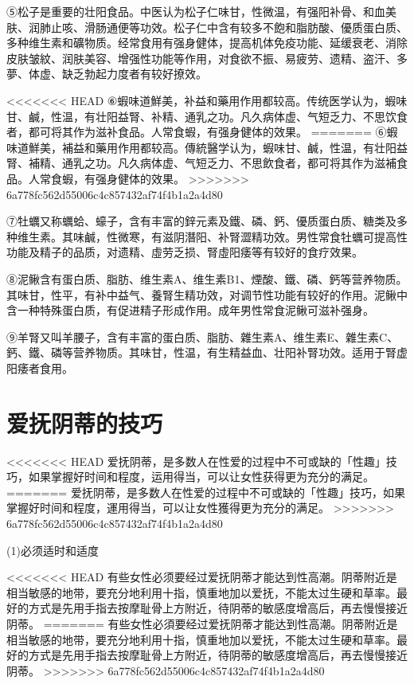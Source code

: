 \documentclass[12pt,UTF8]{ctexbook}
\begin{document}
⑤松子是重要的壮阳食品。中医认为松子仁味甘，性微温，有强阳补骨、和血美肤、润肺止咳、滑肠通便等功效。松子仁中含有较多不飽和脂肪酸、優质蛋白质、多种维生素和礦物质。经常食用有强身健体，提高机体免疫功能、延缓衰老、消除皮肤皱紋、润肤美容、增强性功能等作用，对食欲不振、易疲劳、遗精、盗汗、多夢、体虚、缺乏勃起力度者有较好撩效。

<<<<<<< HEAD
⑥蝦味道鮮美，补益和藥用作用都较高。传统医学认为，蝦味甘、鹹，性温，有壮阳益腎、补精、通乳之功。凡久病体虚、气短乏力、不思饮食者，都可将其作为滋补食品。人常食蝦，有强身健体的效果。
=======
⑥蝦味道鮮美，補益和藥用作用都较高。傳統醫学认为，蝦味甘、鹹，性温，有壮阳益腎、補精、通乳之功。凡久病体虚、气短乏力、不思飲食者，都可将其作为滋補食品。人常食蝦，有强身健体的效果。
>>>>>>> 6a778fc562d55006c4c857432af74f4b1a2a4d80

⑦牡蠣又称蠣蛤、蠔子，含有丰富的鋅元素及鐵、磷、鈣、優质蛋白质、糖类及多种维生素。其味鹹，性微寒，有滋阴潛阳、补腎澀精功效。男性常食牡蠣可提高性功能及精子的品质，对遗精、虛劳乏损、腎虛阳痿等有较好的食疗效果。

⑧泥鳅含有蛋白质、脂肪、维生素A、维生素B1、煙酸、鐵、磷、鈣等营养物质。其味甘，性平，有补中益气、養腎生精功效，对调节性功能有较好的作用。泥鳅中含一种特殊蛋白质，有促进精子形成作用。成年男性常食泥鳅可滋补强身。

⑨羊腎又叫羊腰子，含有丰富的蛋白质、脂肪、雜生素A、维生素E、雜生素C、鈣、鐵、磷等营养物质。其味甘，性温，有生精益血、壮阳补腎功效。适用于腎虚阳痿者食用。

\section{爱抚阴蒂的技巧}

<<<<<<< HEAD
爱抚阴蒂，是多数人在性爱的过程中不可或缺的「性趣」技巧，如果掌握好时间和程度，运用得当，可以让女性获得更为充分的满足。
=======
爱抚阴蒂，是多数人在性爱的过程中不可或缺的「性趣」技巧，如果掌握好时间和程度，運用得当，可以让女性獲得更为充分的满足。
>>>>>>> 6a778fc562d55006c4c857432af74f4b1a2a4d80

(1)必须适时和适度

<<<<<<< HEAD
有些女性必须要经过爱抚阴蒂才能达到性高潮。阴蒂附近是相当敏感的地带，要充分地利用十指，慎重地加以爱抚，不能太过生硬和草率。最好的方式是先用手指去按摩耻骨上方附近，待阴蒂的敏感度增高后，再去慢慢接近阴蒂。
=======
有些女性必須要经过爱抚阴蒂才能达到性高潮。阴蒂附近是相当敏感的地带，要充分地利用十指，慎重地加以爱抚，不能太过生硬和草率。最好的方式是先用手指去按摩耻骨上方附近，待阴蒂的敏感度增高后，再去慢慢接近阴蒂。
>>>>>>> 6a778fc562d55006c4c857432af74f4b1a2a4d80
\end{document}
